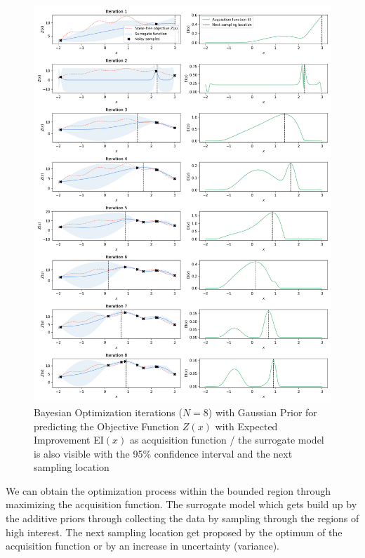 \documentclass[12pt, a4paper]{article}
\begin{document}
\begin{figure}[!htpb]
    \centering
    \includegraphics[width=1\textwidth,trim={0 0 0 0},clip]{figures/bayesian_optimization_from_scratch_iterations.png}
    \caption[Bayesian Optimization iterations]{Bayesian Optimization iterations ($N=8$) with Gaussian Prior for predicting the Objective Function $Z(x)$ with Expected Improvement EI$(x)$ as acquisition function / the surrogate model is also visible with the 95\% confidence interval and the next sampling location}
    \label{fig: bo_iterations}
\end{figure}
\newpage
We can obtain the optimization process within the bounded region through maximizing the acquisition function. The surrogate model which gets build up by the additive priors through collecting the data by sampling through the regions of high interest. The next sampling location get proposed by the optimum of the acquisition function or by an increase in uncertainty (variance). \\
\end{document}
